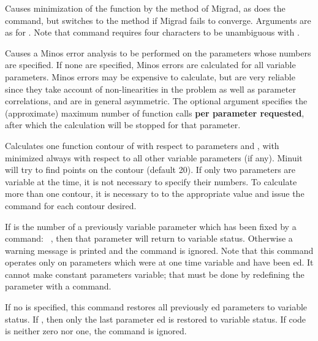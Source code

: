 
Causes minimization of the function by the method of Migrad,
as does the  command, but switches to the  method
if Migrad fails to converge. Arguments are as for .
Note that command requires four characters to be unambiguous with .


Causes a Minos error analysis to be performed on the parameters whose
numbers \Lit{[parno]} are specified.  If none are specified, Minos errors
are calculated for all variable parameters.
Minos errors may be expensive to calculate, but are very reliable since
they take account of non-linearities in the problem as well as
parameter correlations, and are in general asymmetric.
The optional argument \Lit{[maxcalls]} specifies the (approximate) maximum
number of function calls {\bf per parameter requested},
after which the calculation will be stopped for that parameter.


Calculates one function contour of  with respect to parameters
 and , with  
minimized always with respect to all other
 variable parameters (if any). 
Minuit will try to find  points on the contour (default 20).  
If only two parameters are variable
at the time, it is not necessary to specify their numbers. 
To calculate
more than one contour, it is necessary to  
to the appropriate
value and issue the  command for each contour desired.


If  is the number of a previously variable parameter which has
been fixed by a command:
~, then that parameter will
return to variable status.  Otherwise a warning message is printed
and the command is ignored.
Note that this command operates only on parameters which were at one time
variable and have been ed.
It cannot make constant parameters variable;
that must be done by redefining the parameter with a  command.


If no \Lit{[code]} is specified, this command restores all previously 
ed parameters to variable status. 
If , then only the last parameter
ed is restored to variable status.  
If code is neither zero nor one, the command is ignored.

